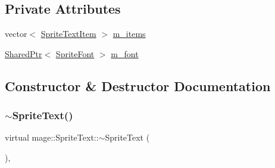 \subsection*{Private Attributes}
\begin{DoxyCompactItemize}
\item 
vector$<$ \hyperlink{structmage_1_1_sprite_text_item}{Sprite\+Text\+Item} $>$ \hyperlink{classmage_1_1_sprite_text_a5990cef53a24dcd6d6bf0ff550145ca4}{m\+\_\+items}
\item 
\hyperlink{namespacemage_a1e01ae66713838a7a67d30e44c67703e}{Shared\+Ptr}$<$ \hyperlink{classmage_1_1_sprite_font}{Sprite\+Font} $>$ \hyperlink{classmage_1_1_sprite_text_a922e37fbcbc431e815ebabe82e4528b0}{m\+\_\+font}
\end{DoxyCompactItemize}


\subsection{Constructor \& Destructor Documentation}
\hypertarget{classmage_1_1_sprite_text_a0a231f260bb855b7be3280aa74a3e5c6}{}\label{classmage_1_1_sprite_text_a0a231f260bb855b7be3280aa74a3e5c6} 
\subsubsection{\texorpdfstring{$\sim$\+Sprite\+Text()}{~SpriteText()}}
{\footnotesize\ttfamily virtual mage\+::\+Sprite\+Text\+::$\sim$\+Sprite\+Text (\begin{DoxyParamCaption}{ }\end{DoxyParamCaption})\hspace{0.3cm}{\ttfamily [virtual]}, {\ttfamily [default]}}

\hypertarget{classmage_1_1_sprite_text_a929b24bba456bfd37a9ebf04db88d4c5}{}\label{classmage_1_1_sprite_text_a929b24bba456bfd37a9ebf04db88d4c5} 

